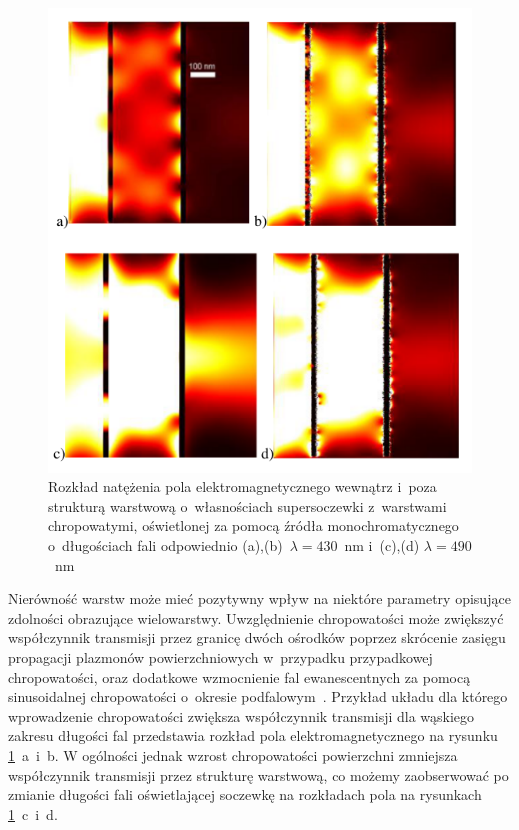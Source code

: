 \begin{figure}[!hbt]
	\begin{center}
	\includegraphics[width=.9\textwidth]{images/multilayer/plp-chropo.png}
	\end{center}
	\caption{Rozkład natężenia pola elektromagnetycznego wewnątrz i~poza strukturą warstwową o~własnościach supersoczewki z~warstwami chropowatymi, oświetlonej za pomocą źródła monochromatycznego o~długościach fali odpowiednio (a),(b)~$\lambda=430$~nm  i~(c),(d) $\lambda=490$~nm~\cite{Stolarek_2013}}
	\label{fig:plp-chropo-fdtd}
\end{figure}

Nierówność warstw może mieć pozytywny wpływ na niektóre parametry opisujące zdolności obrazujące wielowarstwy. Uwzględnienie chropowatości może zwiększyć współczynnik transmisji przez granicę dwóch ośrodków poprzez skrócenie zasięgu propagacji plazmonów powierzchniowych w~przypadku przypadkowej chropowatości, oraz dodatkowe wzmocnienie fal ewanescentnych za pomocą sinusoidalnej chropowatości o~okresie podfalowym~\cite{huang2012subwavelength}. Przykład układu dla którego wprowadzenie chropowatości zwiększa współczynnik transmisji dla wąskiego zakresu długości fal przedstawia rozkład pola elektromagnetycznego na rysunku \ref{fig:plp-chropo-fdtd}~a~i~b. W ogólności jednak wzrost chropowatości powierzchni zmniejsza współczynnik transmisji przez strukturę warstwową, co możemy zaobserwować po zmianie długości fali oświetlającej soczewkę na rozkładach pola na rysunkach \ref{fig:plp-chropo-fdtd}~c~i~d. 

